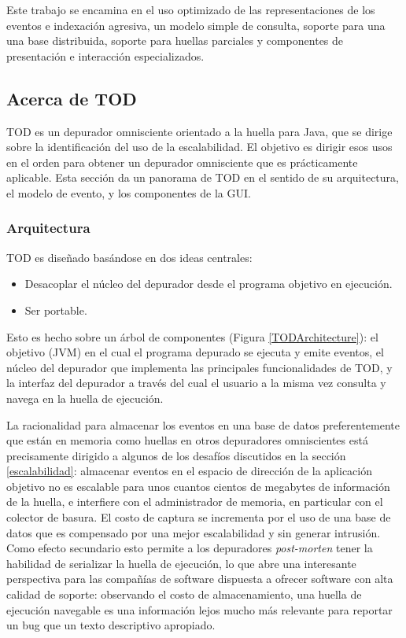 \documentclass[12pt,legalpaper]{report}
\begin{document}
 	Este trabajo se encamina en el uso optimizado de las representaciones de los eventos e indexación agresiva, un modelo simple de consulta, soporte para una una base distribuida, soporte para huellas parciales y componentes de presentación e interacción especializados.

		\subsection{Acerca de TOD}

TOD es un depurador omnisciente orientado a la huella para Java, que se dirige sobre la identificación del uso de la escalabilidad.  El objetivo es dirigir esos usos en el orden para obtener un depurador omnisciente que es prácticamente aplicable.  Esta sección da un panorama de TOD en el sentido de su arquitectura, el modelo de evento, y los componentes de la GUI.

			\subsubsection{Arquitectura}

TOD es diseñado basándose en dos ideas centrales:

\begin{itemize}
	\item Desacoplar el núcleo del depurador desde el programa objetivo en ejecución.
	\item Ser portable.  
\end{itemize}

Esto es hecho sobre un árbol de componentes (Figura \ref{TODArchitecture}):  el objetivo (JVM) en el cual el programa depurado se ejecuta y emite eventos, el núcleo del depurador que implementa las principales funcionalidades de TOD, y la interfaz del depurador a través del cual el usuario a la misma vez consulta y navega en la huella de ejecución.

La racionalidad para almacenar los eventos en una base de datos preferentemente que están en memoria como huellas en otros depuradores omniscientes \cite{odb, bitd, zstep} está precisamente dirigido a algunos de los desafíos discutidos en la sección \ref{escalabilidad}:  almacenar eventos en el espacio de dirección de la aplicación objetivo no es escalable para unos cuantos cientos de megabytes de información de la huella, e interfiere con el administrador de memoria, en particular con el colector de basura.  El costo de captura se incrementa por el uso de una base de datos que es compensado por una mejor escalabilidad y sin generar intrusión.  Como efecto secundario esto permite a los depuradores \textit{post-morten} tener la habilidad de serializar la huella de ejecución, lo que abre una interesante perspectiva para las compañías de software dispuesta a ofrecer software con alta calidad de soporte:  observando el costo de almacenamiento, una huella de ejecución navegable es una información lejos mucho más relevante para reportar un bug que un texto descriptivo apropiado. 
\end{document}

